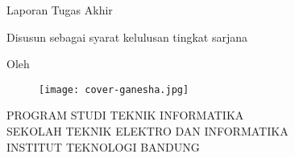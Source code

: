 \pagestyle{empty}

\begin{center}
\smallskip

    \Large \bfseries \MakeUppercase{\thetitle}
    \vfill

    \Large Laporan Tugas Akhir
    \vfill

    \large Disusun sebagai syarat kelulusan tingkat sarjana
    \vfill

    \large Oleh

    \Large \uppercase{\nim}
    \Large \uppercase{\theauthor}

    \vfill
    \begin{figure}[h]
        \centering
      	\texttt{[image: cover-ganesha.jpg]}
    \end{figure}
    \vfill

    \large
    \uppercase{Program Studi Teknik Informatika \\
        Sekolah Teknik Elektro dan Informatika \\
        Institut Teknologi Bandung}

    \thedate{}
    
\end{center}
